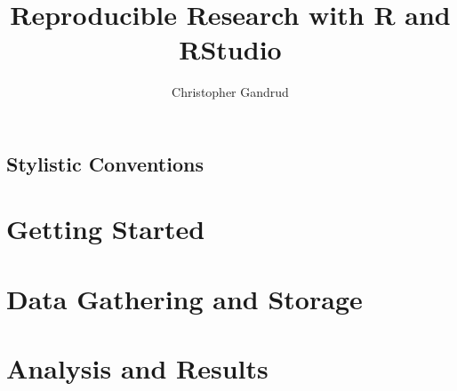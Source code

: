 \documentclass[krantz1]{krantz}
\newcommand{\blankpage}{
\newpage
\thispagestyle{empty}
\mbox{}
\newpage
}
\begin{document}
\title{Reproducible Research with R and RStudio}

\author{Christopher Gandrud}

\maketitle


\frontmatter

\blankpage
\blankpage
\blankpage
\blankpage





\tableofcontents

\chapter*{Stylistic Conventions}\label{StylisticConventions}










\listoffigures
\listoftables


\mainmatter

\setcounter{page}{1}

\part{Getting Started}











\part{Data Gathering and Storage}









\part{Analysis and Results}
\end{document}
